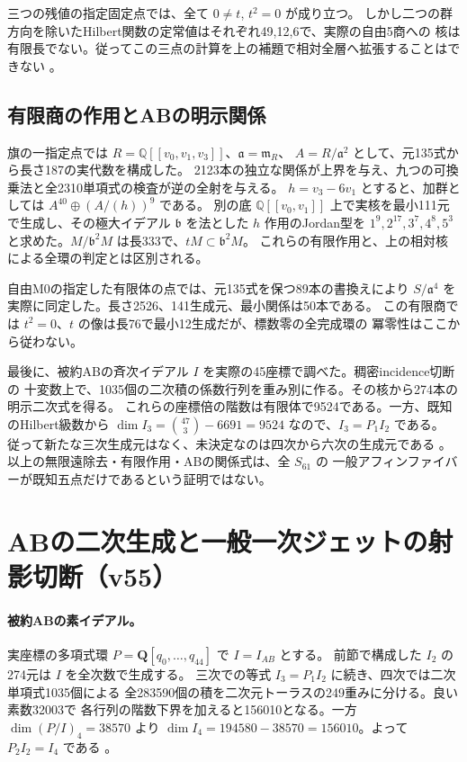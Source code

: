 \documentclass[11pt,a4paper]{ltjsarticle}
\theoremstyle{remark}
\begin{document}
三つの残値の指定固定点では、全て $0\ne t$, $t^2=0$ が成り立つ。
しかし二つの群方向を除いたHilbert関数の定常値はそれぞれ49,12,6で、実際の自由5商への
核は有限長でない。従ってこの三点の計算を上の補題で相対全層へ拡張することはできない
\cite{flag-three-v54}。

\subsection{有限商の作用とABの明示関係}
旗の一指定点では $R=\mathbb Q[[v_0,v_1,v_3]]$、$\mathfrak a=\mathfrak m_R$、
$A=R/\mathfrak a^2$ として、元135式から長さ187の実代数を構成した。
2123本の独立な関係が上界を与え、九つの可換乗法と全2310単項式の検査が逆の全射を与える。
$h=v_3-6v_1$ とすると、加群としては $A^{40}\oplus(A/(h))^9$ である。
別の底 $\mathbb Q[[v_0,v_1]]$ 上で実核を最小111元で生成し、その極大イデアル
$\mathfrak b$ を法とした $h$ 作用のJordan型を
$1^9,2^{17},3^7,4^8,5^3$ と求めた。$M/\mathfrak b^2 M$ は長333で、$tM\subset\mathfrak b^2 M$。
これらの有限作用と、上の相対核による全環の判定とは区別される\cite{flag-first-v54,flag-linear-v54}。

自由M0の指定した有限体の点では、元135式を保つ89本の書換えにより
$S/\mathfrak a^4$ を実際に同定した。長さ2526、141生成元、最小関係は50本である。
この有限商では $t^2=0$、$t$ の像は長76で最小12生成だが、標数零の全完成環の
冪零性はここから従わない\cite{free-third-v54}。

最後に、被約ABの斉次イデアル $I$ を実際の45座標で調べた。稠密incidence切断の
十変数上で、1035個の二次積の係数行列を重み別に作る。その核から274本の明示二次式を得る。
これらの座標倍の階数は有限体で9524である。一方、既知のHilbert級数から
$\dim I_3=\binom{47}{3}-6691=9524$ なので、$I_3=P_1 I_2$ である。
従って新たな三次生成元はなく、未決定なのは四次から六次の生成元である
\cite{ab-quadrics-v54}。以上の無限遠除去・有限作用・ABの関係式は、全 $S_{61}$ の
一般アフィンファイバーが既知五点だけであるという証明ではない。

\section{ABの二次生成と一般一次ジェットの射影切断（v55）}
\paragraph{被約ABの素イデアル。}
実座標の多項式環 $P=\mathbf Q[q_0,\ldots,q_{44}]$ で $I=I_{AB}$ とする。
前節で構成した $I_2$ の274元は $I$ を全次数で生成する。
三次での等式 $I_3=P_1 I_2$ に続き、四次では二次単項式1035個による
全283590個の積を二次元トーラスの249重みに分ける。良い素数32003で
各行列の階数下界を加えると156010となる。一方 $\dim(P/I)_4=38570$ より
$\dim I_4=194580-38570=156010$。よって $P_2 I_2=I_4$ である
\cite{ab-four-v55}。
\end{document}
